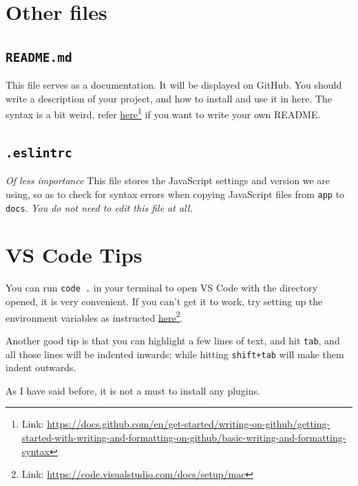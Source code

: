 \section{Other files}

\subsection{\texttt{README.md}}
\label{sec:readme}

This file serves as a documentation. It will be displayed on GitHub. You should write a description of your project, and how to install and use it in here. The syntax is a bit weird, refer \href{https://docs.github.com/en/get-started/writing-on-github/getting-started-with-writing-and-formatting-on-github/basic-writing-and-formatting-syntax}{here}\footnote{Link: \url{https://docs.github.com/en/get-started/writing-on-github/getting-started-with-writing-and-formatting-on-github/basic-writing-and-formatting-syntax}} if you want to write your own README.

\subsection{\texttt{.eslintrc}}

\textit{Of less importance}
\vspace{6mm}
This file stores the JavaScript settings and version we are using, so as to check for syntax errors when copying JavaScript files from \texttt{app} to \texttt{docs}. \textit{You do not need to edit this file at all.}

\section{VS Code Tips}

You can run \texttt{code .} in your terminal to open VS Code with the directory opened, it is very convenient. If you can't get it to work, try setting up the environment variables as instructed \href{https://code.visualstudio.com/docs/setup/mac}{here}\footnote{Link: \url{https://code.visualstudio.com/docs/setup/mac}}.
\vspace{6mm}

Another good tip is that you can highlight a few lines of text, and hit \texttt{tab}, and all those lines will be indented inwards; while hitting \texttt{shift+tab} will make them indent outwards.
\vspace{6mm}

As I have said before, it is not a must to install any plugins.